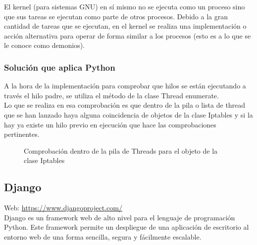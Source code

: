 El kernel (para sistemas GNU) en sí mismo no se ejecuta como un proceso sino que sus tareas se ejecutan como parte de otros procesos. Debido a la gran cantidad de tareas que se ejecutan, en el kernel se realiza una implementación o acción alternativa para operar de forma similar a los procesos (esto es a lo que se le conoce como demonios).\\

\subsubsection{Solución que aplica Python}

A la hora de la implementación para comprobar que hilos se están ejecutando a través el hilo padre, se utiliza el método de la clase Thread enumerate.\\

Lo que se realiza en esa comprobación es que dentro de la pila o lista de thread que se han lanzado haya alguna coincidencia de objetos de la clase Iptables y si la hay ya existe un hilo previo en ejecución que hace las comprobaciones pertinentes.\\

\begin{figure}
  
  \caption{Comprobación dentro de la pila de Threads para el objeto de la clase Iptables}
\end{figure}
\newpage
\subsection{Django}


Web: \url{https://www.djangoproject.com/}\\

Django es un framework web de alto nivel para el lenguaje de programación Python. Este framework permite un despliegue de una aplicación de escritorio al entorno web de una forma sencilla, segura y fácilmente escalable. \\

